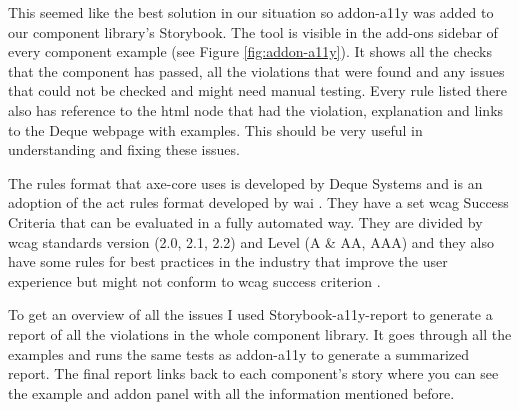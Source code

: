 \documentclass{master_thesis}
\begin{document}
This seemed like the best solution in our situation so addon-a11y was added to our component library’s Storybook. The tool is visible in the add-ons sidebar of every component example (see Figure \ref{fig:addon-a11y}). It shows all the checks that the component has passed, all the violations that were found and any issues that could not be checked and might need manual testing. Every rule listed there also has reference to the \ac{html} node that had the violation, explanation and links to the Deque webpage with examples. This should be very useful in understanding and fixing these issues.

The rules format that axe-core uses is developed by Deque Systems and is an adoption of the \ac{act} rules format developed by \ac{wai} \citep{Fiers2017}. They have a set \ac{wcag} Success Criteria that can be evaluated in a fully automated way. They are divided by \ac{wcag} standards version (2.0, 2.1, 2.2) and Level (A \& AA, AAA) and they also have some rules for best practices in the industry that improve the user experience but might not conform to \ac{wcag} success criterion \citep{Fiers2023}.

To get an overview of all the issues I used Storybook-a11y-report \citep{Karube2020} to generate a report of all the violations in the whole component library. It goes through all the examples and runs the same tests as addon-a11y to generate a summarized report. The final report links back to each component's story where you can see the example and addon panel with all the information mentioned before. 
\end{document}
